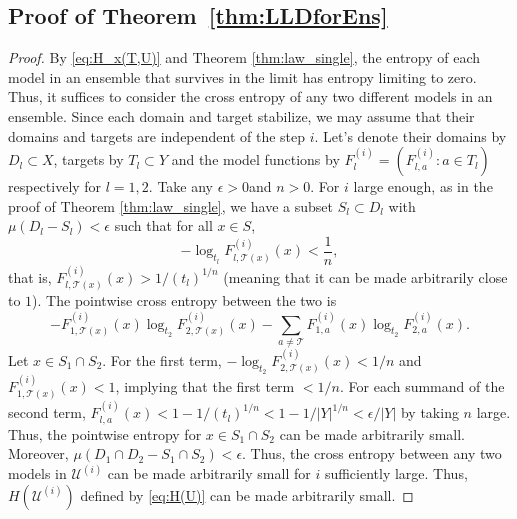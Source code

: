 \documentclass{article}
\theoremstyle{plain}
\theoremstyle{definition}
\theoremstyle{remark}
\newcommand{\cT}{\mathcal{T}}
\newcommand{\cU}{\mathcal{U}}
\begin{document}
\subsection{Proof of Theorem~\ref{thm:LLDforEns}}
\label{app:proof:thm:LLDforEns}
\begin{proof}
	
	By \eqref{eq:H_x(T,U)} and Theorem \ref{thm:law_single}, the entropy of each model in an ensemble that survives in the limit has entropy limiting to zero. Thus, it suffices to consider the cross entropy of any two different models in an ensemble. Since each domain and target stabilize, we may assume that their domains and targets are independent of the step $i$. Let's denote their domains by $D_l \subset X$, targets by $T_l \subset Y$ and the model functions by $F^{(i)}_l= (F^{(i)}_{l,a}:a\in T_l)$ respectively for $l=1,2$. Take any $\epsilon > 0$and $n>0$. For $i$ large enough, as in the proof of Theorem \ref{thm:law_single}, we have a subset $S_l \subset D_l$ with $\mu(D_l - S_l) < \epsilon$ such that for all $x \in S$,
	$$ -\log_{t_l} F_{l,\cT(x)}^{(i)}(x) < \frac{1}{n}, $$
	that is, $F_{l,\cT(x)}^{(i)}(x) > 1/(t_l)^{1/n}$ (meaning that it can be made arbitrarily close to $1$). The pointwise cross entropy between the two is
	$$ -F_{1,\cT(x)}^{(i)}(x) \log_{t_2} F_{2,\cT(x)}^{(i)}(x) - \sum_{a\not=\cT} F_{1,a}^{(i)}(x) \log_{t_2} F_{2,a}^{(i)}(x). $$
	Let $x \in S_1 \cap S_2$. For the first term, $-\log_{t_2} F_{2,\cT(x)}^{(i)}(x) < 1/n$ and $F_{1,\cT(x)}^{(i)}(x) < 1$, implying that the first term $<1/n$. For each summand of the second term, $F_{l,a}^{(i)}(x) < 1-1/(t_l)^{1/n} < 1-1/|Y|^{1/n} < \epsilon / |Y|$ by taking $n$ large. Thus, the pointwise entropy for $x \in S_1 \cap S_2$ can be made arbitrarily small. Moreover, $\mu(D_1 \cap D_2 - S_1 \cap S_2) < \epsilon$. Thus, the cross entropy between any two models in $\cU^{(i)}$ can be made arbitrarily small for $i$ sufficiently large. Thus, $H(\cU^{(i)})$ defined by \eqref{eq:H(U)} can be made arbitrarily small.
\end{proof}
\clearpage
\end{document}
